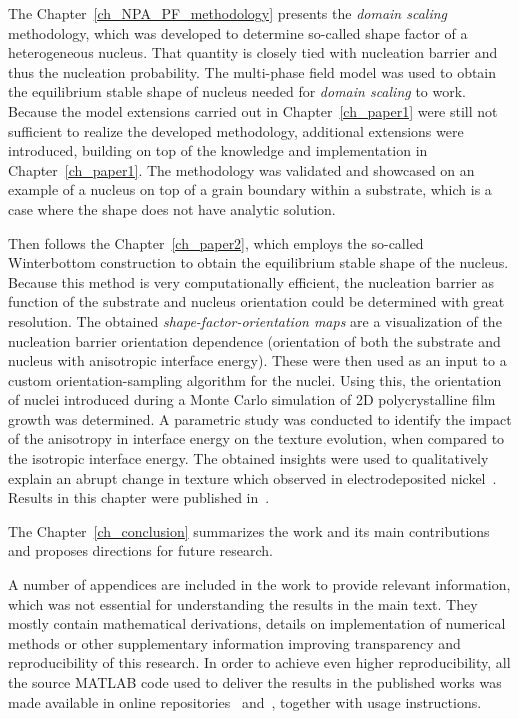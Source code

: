 The Chapter~\ref{ch_NPA_PF_methodology} presents the \textit{domain scaling} methodology, which was developed to determine so-called shape factor of a heterogeneous nucleus. That quantity is closely tied with nucleation barrier and thus the nucleation probability. The multi-phase field model was used to obtain the equilibrium stable shape of nucleus needed for \textit{domain scaling} to work. Because the model extensions carried out in Chapter~\ref{ch_paper1} were still not sufficient to realize the developed methodology, additional extensions were introduced, building on top of the knowledge and implementation in Chapter~\ref{ch_paper1}. The methodology was validated and showcased on an example of a nucleus on top of a grain boundary within a substrate, which is a case where the shape does not have analytic solution.

Then follows the Chapter~\ref{ch_paper2}, which employs the so-called Winterbottom construction to obtain the equilibrium stable shape of the nucleus. Because this method is very computationally efficient, the nucleation barrier as function of the substrate and nucleus orientation could be determined with great resolution. The obtained \textit{shape-factor-orientation maps} are a visualization of the nucleation barrier orientation dependence (orientation of both the substrate and nucleus with anisotropic interface energy). These were then used as an input to a custom orientation-sampling algorithm for the nuclei. Using this, the orientation of nuclei introduced during a Monte Carlo simulation of 2D polycrystalline film growth was determined. A parametric study was conducted to identify the impact of the anisotropy in interface energy on the texture evolution, when compared to the isotropic interface energy. The obtained insights were used to qualitatively explain an abrupt change in texture which observed in electrodeposited nickel~\cite{Alimadadi2016}. Results in this chapter were published in~\cite{Minar2024}. 

The Chapter~\ref{ch_conclusion} summarizes the work and its main contributions and proposes directions for future research.

A number of appendices are included in the work to provide relevant information, which was not essential for understanding the results in the main text. They mostly contain mathematical derivations, details on implementation of numerical methods or other supplementary information improving transparency and reproducibility of this research. In order to achieve even higher reproducibility, all the source MATLAB code used to deliver the results in the published works was made available in online repositories~\cite{Minar2022dataset} and~\cite{Minar2023dataset}, together with usage instructions.





